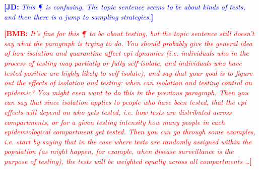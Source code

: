 \documentclass[12pt]{article}
\newcommand{\comment}{\showcomment}
\newcommand{\showcomment}[3]{\textcolor{#1}{\textbf{[#2: }\textsl{#3}\textbf{]}}}
\newcommand{\jd}[1]{\comment{blue}{JD}{#1}}
\newcommand{\bmb}[1]{\comment{red}{BMB}{#1}}
\theoremstyle{definition} %
\begin{document}



\jd{This \P\ is confusing. The topic sentence seems to be about kinds of tests, and then there is a jump to sampling strategies.}

\bmb{It's fine for this \P\ to be about testing, but the topic sentence still doesn't say what the paragraph is trying to do. You should probably give the general idea of how isolation and quarantine affect epi dynamics (i.e. individuals who in the process of testing may partially or fully self-isolate, and individuals who have tested positive are highly likely to self-isolate), and say that your goal is to figure out the effects of isolation and testing: when can isolation and testing control an epidemic? You might even want to do this in the \emph{previous} paragraph. Then you can say that since isolation applies to people who have been tested, that the epi effects will depend on \emph{who gets tested}, i.e. how tests are distributed across compartments, or for a given testing intensity how many people in each epidemiological compartment get tested. Then you can go through some examples, i.e. start by saying that in the case where tests are randomly assigned within the population (as might happen, for example, when disease surveillance is the purpose of testing), the tests will be weighted equally across all compartments \ldots}
\end{document}
